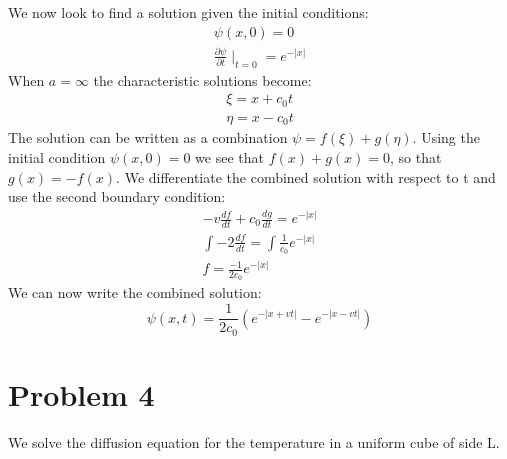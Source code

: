 \documentclass[a4paper,10pt]{article}
\numberwithin{equation}{section}
\begin{document}
We now look to find a solution given the initial conditions:
\begin{gather}
\psi(x,0)=0\\
\frac{\partial \psi}{\partial t}\mid_{t=0}=e^{-|x|}
\end{gather}
When $a=\infty$ the characteristic solutions become:
\begin{gather}
\xi=x+c_0t\\
\eta=x-c_0t
\end{gather}
The solution can be written as a combination $\psi=f(\xi)+g(\eta)$. 
Using the initial condition $\psi(x,0)=0$ we see that $f(x)+g(x)=0$, so that $g(x)=-f(x)$.
We differentiate the combined solution with respect to t and use the second boundary condition:
\begin{gather}
-v\frac{df}{dt}+c_0\frac{dg}{dt}=e^{-|x|}\\
\int-2\frac{df}{dt}=\int\frac{1}{c_0}e^{-|x|}\\
f=\frac{-1}{2c_0}e^{-|x|}
\end{gather}
We can now write the combined solution:
\begin{equation}
\psi(x,t)=\frac{1}{2c_0}(e^{-|x+vt|}-e^{-|x-vt|}) 
\end{equation}

\section{Problem 4}
We solve the diffusion equation for the temperature in a uniform cube of side L.
\end{document}
